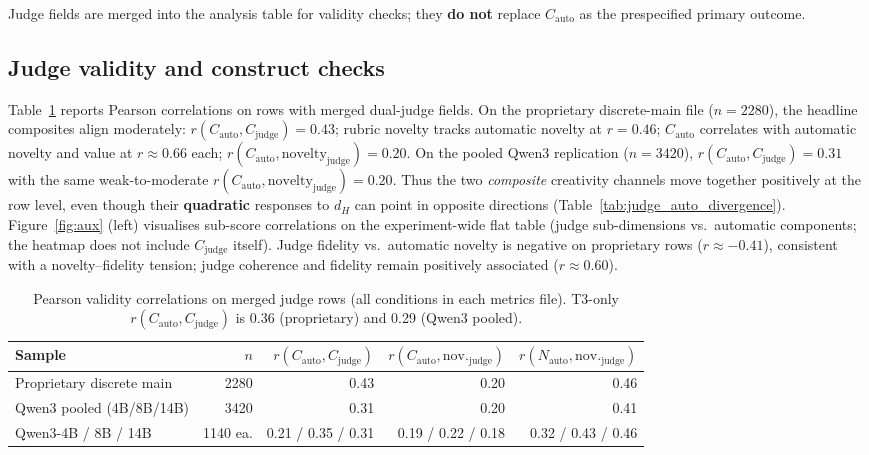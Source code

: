 \documentclass[sigconf,nonacm]{acmart}
\begin{document}
Judge fields are merged into the analysis table for validity checks; they \textbf{do not} replace $C_{\mathrm{auto}}$ as the prespecified primary outcome.

\subsection{Judge validity and construct checks}

Table~\ref{tab:validity_corr} reports Pearson correlations on rows with merged dual-judge fields.
On the proprietary discrete-main file ($n{=}2280$), the headline composites align moderately: $r(C_{\mathrm{auto}},C_{\mathrm{judge}}){=}0.43$; rubric novelty tracks automatic novelty at $r{=}0.46$; $C_{\mathrm{auto}}$ correlates with automatic novelty and value at $r{\approx}0.66$ each; $r(C_{\mathrm{auto}},\mathrm{novelty}_{\mathrm{judge}}){=}0.20$.
On the pooled Qwen3 replication ($n{=}3420$), $r(C_{\mathrm{auto}},C_{\mathrm{judge}}){=}0.31$ with the same weak-to-moderate $r(C_{\mathrm{auto}},\mathrm{novelty}_{\mathrm{judge}}){=}0.20$.
Thus the two \emph{composite} creativity channels move together positively at the row level, even though their \textbf{quadratic} responses to $d_H$ can point in opposite directions (Table~\ref{tab:judge_auto_divergence}).
Figure~\ref{fig:aux} (left) visualises sub-score correlations on the experiment-wide flat table (judge sub-dimensions vs.\ automatic components; the heatmap does not include $C_{\mathrm{judge}}$ itself).
Judge fidelity vs.\ automatic novelty is negative on proprietary rows ($r{\approx}{-}0.41$), consistent with a novelty--fidelity tension; judge coherence and fidelity remain positively associated ($r{\approx}0.60$).

\begin{table}[t]
\centering
\small
\begin{tabular}{lrrrr}
\toprule
Sample & $n$ & $r(C_{\mathrm{auto}},C_{\mathrm{judge}})$ & $r(C_{\mathrm{auto}},\mathrm{nov.}_{\mathrm{judge}})$ & $r(N_{\mathrm{auto}},\mathrm{nov.}_{\mathrm{judge}})$ \\
\midrule
Proprietary discrete main & 2280 & 0.43 & 0.20 & 0.46 \\
Qwen3 pooled (4B/8B/14B) & 3420 & 0.31 & 0.20 & 0.41 \\
Qwen3-4B / 8B / 14B & 1140 ea. & 0.21 / 0.35 / 0.31 & 0.19 / 0.22 / 0.18 & 0.32 / 0.43 / 0.46 \\
\bottomrule
\end{tabular}
\caption{Pearson validity correlations on merged judge rows (all conditions in each metrics file). T3-only $r(C_{\mathrm{auto}},C_{\mathrm{judge}})$ is 0.36 (proprietary) and 0.29 (Qwen3 pooled).}
\label{tab:validity_corr}
\end{table}
\end{document}
